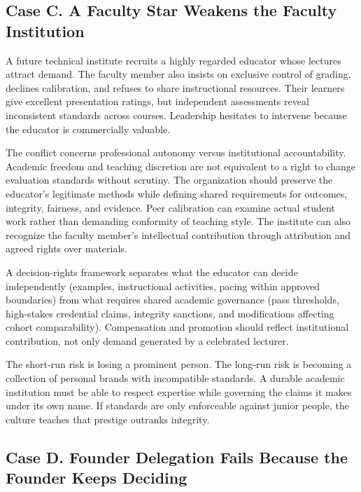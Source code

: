 \subsection*{Case C. A Faculty Star Weakens the Faculty Institution}

A future technical institute recruits a highly regarded educator whose lectures attract demand. The faculty member also insists on exclusive control of grading, declines calibration, and refuses to share instructional resources. Their learners give excellent presentation ratings, but independent assessments reveal inconsistent standards across courses. Leadership hesitates to intervene because the educator is commercially valuable.

The conflict concerns professional autonomy versus institutional accountability. Academic freedom and teaching discretion are not equivalent to a right to change evaluation standards without scrutiny. The organization should preserve the educator's legitimate methods while defining shared requirements for outcomes, integrity, fairness, and evidence. Peer calibration can examine actual student work rather than demanding conformity of teaching style. The institute can also recognize the faculty member's intellectual contribution through attribution and agreed rights over materials.

A decision-rights framework separates what the educator can decide independently (examples, instructional activities, pacing within approved boundaries) from what requires shared academic governance (pass thresholds, high-stakes credential claims, integrity sanctions, and modifications affecting cohort comparability). Compensation and promotion should reflect institutional contribution, not only demand generated by a celebrated lecturer.

The short-run risk is losing a prominent person. The long-run risk is becoming a collection of personal brands with incompatible standards. A durable academic institution must be able to respect expertise while governing the claims it makes under its own name. If standards are only enforceable against junior people, the culture teaches that prestige outranks integrity.

\subsection*{Case D. Founder Delegation Fails Because the Founder Keeps Deciding}


